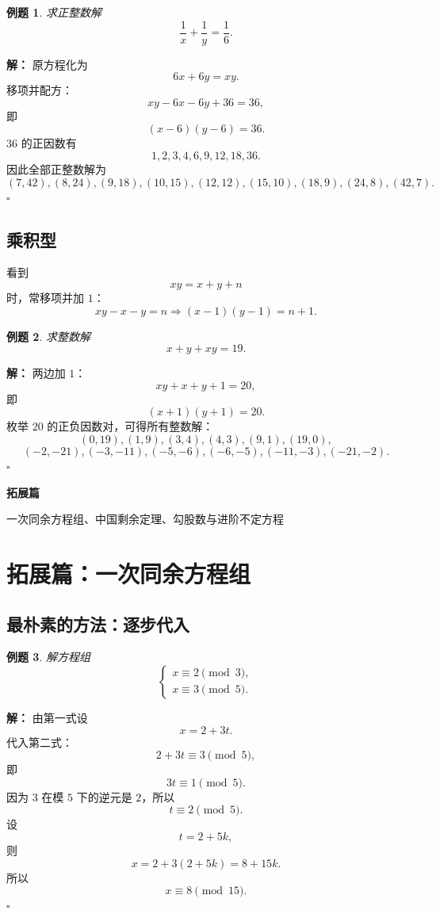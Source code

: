 \documentclass[11pt,a4paper,fontset=fandol]{ctexart}
\theoremstyle{formaltheorem}
\theoremstyle{formalexample}
\newtheorem{example}{例题}[section]
\newenvironment{solution}{\par\noindent\textbf{解：}}{\hfill$\square$\par}
\newcommand{\partdivider}[2]{%
  \clearpage
  \thispagestyle{empty}
  \vspace*{\fill}
  \begin{center}
  \begin{tcolorbox}[
    enhanced,
    width=0.78\textwidth,
    colback=lightblue,
    colframe=mainblue,
    boxrule=0.9pt,
    arc=0mm,
    left=6mm,
    right=6mm,
    top=8mm,
    bottom=8mm
  ]
  \centering
  {\fontsize{24}{30}\selectfont\bfseries #1\par}
  \vspace{0.6cm}
  {\large #2\par}
  \end{tcolorbox}
  \end{center}
  \vspace*{\fill}
  \clearpage
}
\begin{document}
\begin{example}
求正整数解
\[
\frac1x+\frac1y=\frac16.
\]
\end{example}

\begin{solution}
原方程化为
\[
6x+6y=xy.
\]
移项并配方：
\[
xy-6x-6y+36=36,
\]
即
\[
(x-6)(y-6)=36.
\]
36 的正因数有
\[
1,2,3,4,6,9,12,18,36.
\]
因此全部正整数解为
\[
\boxed{(7,42),(8,24),(9,18),(10,15),(12,12),(15,10),(18,9),(24,8),(42,7)}.
\]
\end{solution}

\subsection{乘积型}

看到
\[
xy=x+y+n
\]
时，常移项并加 $1$：
\[
xy-x-y=n\Rightarrow (x-1)(y-1)=n+1.
\]

\begin{example}
求整数解
\[
x+y+xy=19.
\]
\end{example}

\begin{solution}
两边加 $1$：
\[
xy+x+y+1=20,
\]
即
\[
(x+1)(y+1)=20.
\]
枚举 $20$ 的正负因数对，可得所有整数解：
\[
\boxed{(0,19),(1,9),(3,4),(4,3),(9,1),(19,0),}
\]
\[
\boxed{(-2,-21),(-3,-11),(-5,-6),(-6,-5),(-11,-3),(-21,-2).}
\]
\end{solution}

\partdivider{拓展篇}{一次同余方程组、中国剩余定理、勾股数与进阶不定方程}

\section{拓展篇：一次同余方程组}

\subsection{最朴素的方法：逐步代入}

\begin{example}
解方程组
\[
\begin{cases}
x\equiv 2\pmod 3,\\
x\equiv 3\pmod 5.
\end{cases}
\]
\end{example}

\begin{solution}
由第一式设
\[
x=2+3t.
\]
代入第二式：
\[
2+3t\equiv 3\pmod 5,
\]
即
\[
3t\equiv 1\pmod 5.
\]
因为 $3$ 在模 $5$ 下的逆元是 $2$，所以
\[
t\equiv 2\pmod 5.
\]
设
\[
t=2+5k,
\]
则
\[
x=2+3(2+5k)=8+15k.
\]
所以
\[
\boxed{x\equiv 8\pmod{15}}.
\]
\end{solution}
\end{document}
